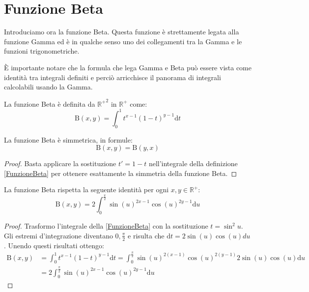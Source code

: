 \section{Funzione Beta}
Introduciamo ora la funzione Beta. 
Questa funzione è strettamente legata alla funzione Gamma ed è in qualche senso uno dei collegamenti tra la Gamma e le funzioni
trigonometriche. 

È importante notare che la formula che lega Gamma e Beta può essere vista come identità tra integrali definiti e perciò arricchisce
il panorama di integrali calcolabili usando la Gamma.

\begin{definition}\label{FunzioneBeta} 
	La funzione Beta è definita da $\mathbb{R^+}^2$ in $\mathbb{R^+}$ come:
	\begin{equation*}
		\mathrm{B} (x,y)=\int_0^1 t^{x-1}(1-t)^{y-1} \mathrm{d}t
	\end{equation*}
\end{definition}

\begin{lemma}\label{BetaSimmetrica} 
	La funzione Beta è simmetrica, in formule:
	\begin{equation*}
		\mathrm{B}(x,y)=\mathrm{B}(y,x)
	\end{equation*}
\end{lemma}
\begin{proof}
	Basta applicare la sostituzione $t'=1-t$ nell'integrale della definizione \cref{FunzioneBeta} 
	per ottenere esattamente la simmetria della funzione Beta.
\end{proof}

\begin{lemma}\label{BetaTrigonometrica} 
	La funzione Beta rispetta la seguente identità per ogni $x,y\in \mathbb{R^+}$:
	\begin{equation*}
		\mathrm{B} (x,y)=2\int_0^{\frac\pi2} \sin(u)^{2x-1}\cos(u)^{2y-1}\mathrm{d}u
	\end{equation*}
\end{lemma}
\begin{proof}
	Trasformo l'integrale della \cref{FunzioneBeta} con la sostituzione $t=\sin^2u$.\\
	Gli estremi d'integrazione diventano $0,\frac{\pi}2$ e risulta che $\mathrm{d}t=2\sin(u)\cos(u)du$. Unendo questi risultati ottengo:
	\begin{equation*}\begin{split}
		\mathrm{B}(x,y) & =\int_0^1 t^{x-1}(1-t)^{y-1} \mathrm{d}t = \int_0^{\frac\pi2} \sin(u)^{2(x-1)}\cos(u)^{2(y-1)}2\sin(u)\cos(u)\mathrm{d}u\\
		& = 2\int_0^{\frac\pi2} \sin(u)^{2x-1}\cos(u)^{2y-1}\mathrm{d}u
	\end{split}\end{equation*}
\end{proof}

